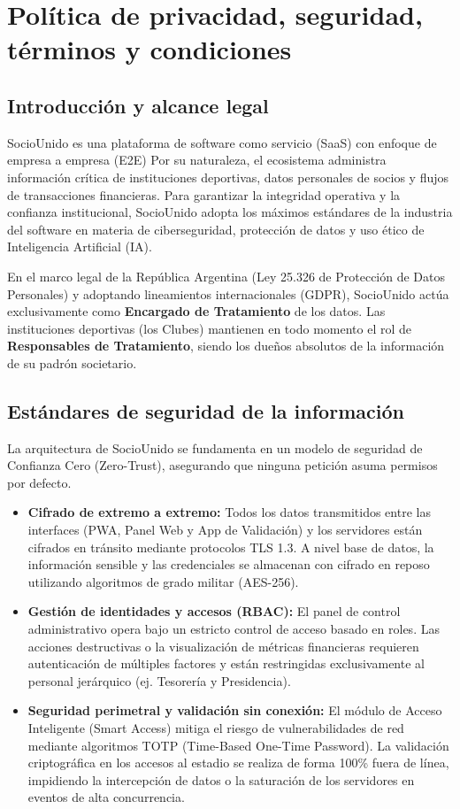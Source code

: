 \section{Política de privacidad, seguridad, términos y condiciones}

\subsection{Introducción y alcance legal}
SocioUnido es una plataforma de software como servicio (SaaS) con enfoque de empresa a empresa (E2E) Por su naturaleza, el ecosistema administra información crítica de instituciones deportivas, datos personales de socios y flujos de transacciones financieras. Para garantizar la integridad operativa y la confianza institucional, SocioUnido adopta los máximos estándares de la industria del software en materia de ciberseguridad, protección de datos y uso ético de Inteligencia Artificial (IA).

En el marco legal de la República Argentina (Ley 25.326 de Protección de Datos Personales) y adoptando lineamientos internacionales (GDPR), SocioUnido actúa exclusivamente como \textbf{Encargado de Tratamiento} de los datos. Las instituciones deportivas (los Clubes) mantienen en todo momento el rol de \textbf{Responsables de Tratamiento}, siendo los dueños absolutos de la información de su padrón societario.

\subsection{Estándares de seguridad de la información}
La arquitectura de SocioUnido se fundamenta en un modelo de seguridad de Confianza Cero (Zero-Trust), asegurando que ninguna petición asuma permisos por defecto.

\begin{itemize}
    \item \textbf{Cifrado de extremo a extremo:} Todos los datos transmitidos entre las interfaces (PWA, Panel Web y App de Validación) y los servidores están cifrados en tránsito mediante protocolos TLS 1.3. A nivel base de datos, la información sensible y las credenciales se almacenan con cifrado en reposo utilizando algoritmos de grado militar (AES-256).
    \item \textbf{Gestión de identidades y accesos (RBAC):} El panel de control administrativo opera bajo un estricto control de acceso basado en roles. Las acciones destructivas o la visualización de métricas financieras requieren autenticación de múltiples factores y están restringidas exclusivamente al personal jerárquico (ej. Tesorería y Presidencia).
    \item \textbf{Seguridad perimetral y validación sin conexión:} El módulo de Acceso Inteligente (Smart Access) mitiga el riesgo de vulnerabilidades de red mediante algoritmos TOTP (Time-Based One-Time Password). La validación criptográfica en los accesos al estadio se realiza de forma 100\% fuera de línea, impidiendo la intercepción de datos o la saturación de los servidores en eventos de alta concurrencia.
\end{itemize}

